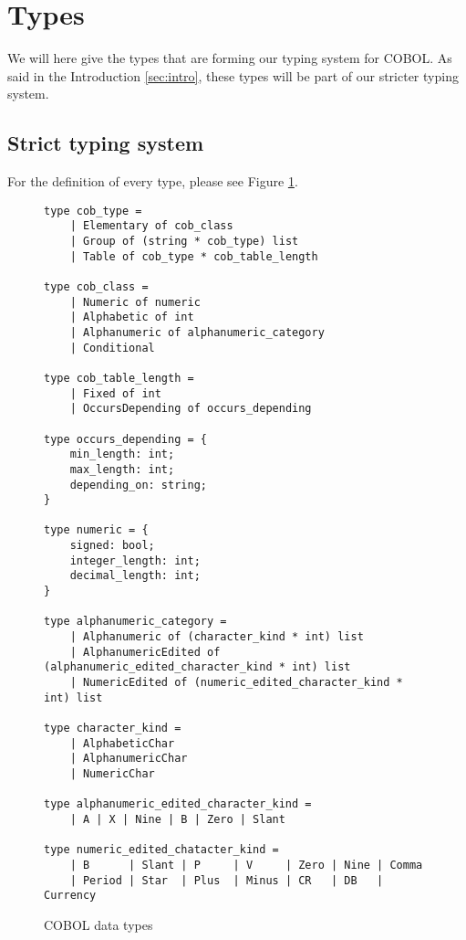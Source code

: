 \documentclass[a4paper,10pt]{article}
\begin{document}
\section{Types}
We will here give the types that are forming our typing system for COBOL. As said in the Introduction
\ref{sec:intro}, these types will be part of our stricter typing system.
\subsection{Strict typing system}
For the definition of every type, please see Figure \ref{fig:cob_types}.
\begin{figure}[!ht]
  \begin{verbatim}
type cob_type =
    | Elementary of cob_class
    | Group of (string * cob_type) list
    | Table of cob_type * cob_table_length

type cob_class =
    | Numeric of numeric
    | Alphabetic of int
    | Alphanumeric of alphanumeric_category
    | Conditional

type cob_table_length =
    | Fixed of int
    | OccursDepending of occurs_depending

type occurs_depending = {
    min_length: int;
    max_length: int;
    depending_on: string;
}

type numeric = {
    signed: bool;
    integer_length: int;
    decimal_length: int;
}

type alphanumeric_category =
    | Alphanumeric of (character_kind * int) list
    | AlphanumericEdited of (alphanumeric_edited_character_kind * int) list
    | NumericEdited of (numeric_edited_character_kind * int) list

type character_kind =
    | AlphabeticChar
    | AlphanumericChar
    | NumericChar

type alphanumeric_edited_character_kind =
    | A | X | Nine | B | Zero | Slant

type numeric_edited_chatacter_kind =
    | B      | Slant | P     | V     | Zero | Nine | Comma
    | Period | Star  | Plus  | Minus | CR   | DB   | Currency
  \end{verbatim}
  \caption{COBOL data types}
  \label{fig:cob_types}
\end{figure}
\end{document}
